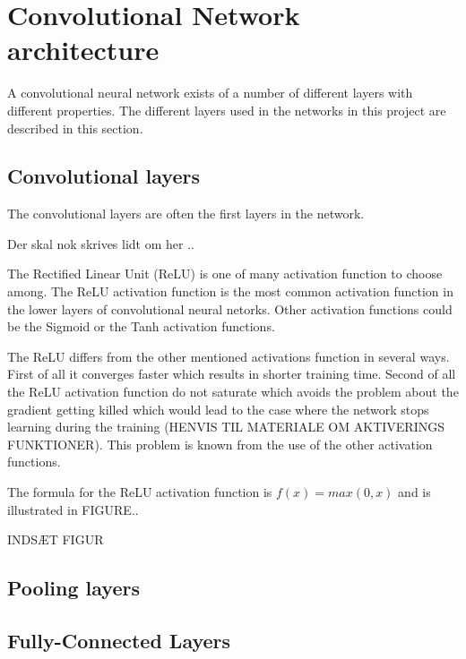 \graphicspath{{Chapters/Project/}}

\section{Convolutional Network architecture} %
\label{sec:convolutional_network_architecture}

A convolutional neural network exists of a number of different layers with different properties. The different layers used in the networks in this project are described in this section. 

\subsection{Convolutional layers} %
\label{sub:conv_layers}

The convolutional layers are often the first layers in the network.

Der skal nok skrives lidt om her ..

The Rectified Linear Unit (ReLU) is one of many activation function to choose
among. The ReLU activation function is the most common activation function in the lower layers of convolutional neural netorks. Other activation functions could be the Sigmoid or the Tanh activation functions.

The ReLU differs from the other mentioned activations function in several ways. First of all it converges faster which results in shorter training time. Second of all the ReLU activation function do not saturate which avoids the problem about the gradient getting killed which would lead to the case where the network stops learning during the training (HENVIS TIL MATERIALE OM AKTIVERINGS FUNKTIONER). This problem is known from the use of the other activation functions. 

The formula for the ReLU activation function is $f(x)=max(0,x)$ and is illustrated in FIGURE..

INDSÆT FIGUR


\subsection{Pooling layers} %
\label{sub:pool_layers}


\subsection{Fully-Connected Layers} %
\label{sub:fc_layers}


